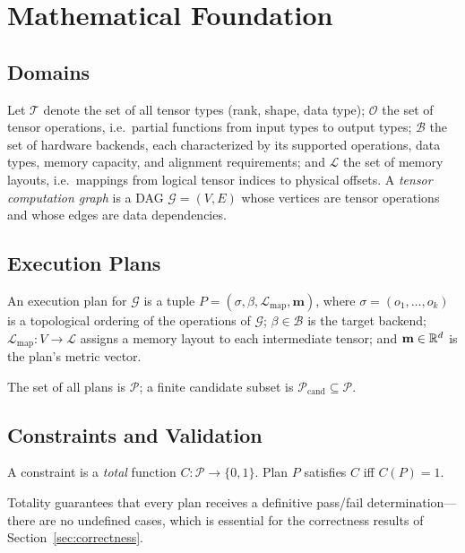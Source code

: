 \section{Mathematical Foundation}
\label{sec:math}

\subsection{Domains}

Let $\mathcal{T}$ denote the set of all tensor types (rank, shape, data
type); $\mathcal{O}$ the set of tensor operations, i.e.\ partial
functions from input types to output types; $\mathcal{B}$ the set of
hardware backends, each characterized by its supported operations,
data types, memory capacity, and alignment requirements; and
$\mathcal{L}$ the set of memory layouts, i.e.\ mappings from logical
tensor indices to physical offsets. A \emph{tensor computation graph}
is a DAG $\mathcal{G} = (V, E)$ whose vertices are tensor operations
and whose edges are data dependencies.

\subsection{Execution Plans}

\begin{definition}
An execution plan for $\mathcal{G}$ is a tuple
$P = (\sigma, \beta, \mathcal{L}_{\mathrm{map}}, \mathbf{m})$, where
$\sigma = (o_1, \ldots, o_k)$ is a topological ordering of the
operations of $\mathcal{G}$; $\beta \in \mathcal{B}$ is the target
backend; $\mathcal{L}_{\mathrm{map}}: V \to \mathcal{L}$ assigns a
memory layout to each intermediate tensor; and
$\mathbf{m} \in \mathbb{R}^d$ is the plan's metric vector.
\end{definition}

The set of all plans is $\mathcal{P}$; a finite candidate subset is
$\mathcal{P}_{\text{cand}} \subseteq \mathcal{P}$.

\subsection{Constraints and Validation}

\begin{definition}[Constraint]
A constraint is a \emph{total} function
$C: \mathcal{P} \to \{0, 1\}$. Plan $P$ satisfies $C$ iff $C(P) = 1$.
\end{definition}

Totality guarantees that every plan receives a definitive pass/fail
determination---there are no undefined cases, which is essential for
the correctness results of Section~\ref{sec:correctness}.

